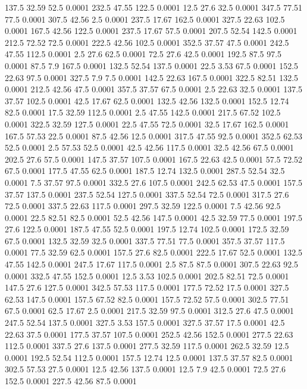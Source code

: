 137.5	32.59	52.5	0.0001
232.5	47.55	122.5	0.0001
12.5	27.6	32.5	0.0001
347.5	77.51	77.5	0.0001
307.5	42.56	2.5	0.0001
237.5	17.67	162.5	0.0001
327.5	22.63	102.5	0.0001
167.5	42.56	122.5	0.0001
237.5	17.67	57.5	0.0001
207.5	52.54	142.5	0.0001
212.5	72.52	72.5	0.0001
222.5	42.56	102.5	0.0001
352.5	37.57	47.5	0.0001
242.5	47.55	112.5	0.0001
2.5	27.6	62.5	0.0001
72.5	27.6	42.5	0.0001
192.5	87.5	97.5	0.0001
87.5	7.9	167.5	0.0001
132.5	52.54	137.5	0.0001
22.5	3.53	67.5	0.0001
152.5	22.63	97.5	0.0001
327.5	7.9	7.5	0.0001
142.5	22.63	167.5	0.0001
322.5	82.51	132.5	0.0001
212.5	42.56	47.5	0.0001
357.5	37.57	67.5	0.0001
2.5	22.63	32.5	0.0001
137.5	37.57	102.5	0.0001
42.5	17.67	62.5	0.0001
132.5	42.56	132.5	0.0001
152.5	12.74	82.5	0.0001
17.5	32.59	112.5	0.0001
2.5	47.55	142.5	0.0001
217.5	67.52	102.5	0.0001
322.5	32.59	127.5	0.0001
22.5	47.55	72.5	0.0001
32.5	17.67	162.5	0.0001
167.5	57.53	22.5	0.0001
87.5	42.56	12.5	0.0001
317.5	47.55	92.5	0.0001
352.5	62.53	52.5	0.0001
2.5	57.53	52.5	0.0001
42.5	42.56	117.5	0.0001
32.5	42.56	67.5	0.0001
202.5	27.6	57.5	0.0001
147.5	37.57	107.5	0.0001
167.5	22.63	42.5	0.0001
57.5	72.52	67.5	0.0001
177.5	47.55	62.5	0.0001
187.5	12.74	132.5	0.0001
287.5	52.54	32.5	0.0001
7.5	37.57	97.5	0.0001
332.5	27.6	107.5	0.0001
242.5	62.53	47.5	0.0001
157.5	37.57	137.5	0.0001
237.5	52.54	127.5	0.0001
337.5	52.54	72.5	0.0001
317.5	27.6	72.5	0.0001
337.5	22.63	117.5	0.0001
297.5	32.59	122.5	0.0001
7.5	42.56	92.5	0.0001
22.5	82.51	82.5	0.0001
52.5	42.56	147.5	0.0001
42.5	32.59	77.5	0.0001
197.5	27.6	122.5	0.0001
187.5	47.55	52.5	0.0001
197.5	12.74	102.5	0.0001
172.5	32.59	67.5	0.0001
132.5	32.59	32.5	0.0001
337.5	77.51	77.5	0.0001
357.5	37.57	117.5	0.0001
77.5	32.59	62.5	0.0001
157.5	27.6	82.5	0.0001
222.5	17.67	52.5	0.0001
132.5	47.55	142.5	0.0001
247.5	17.67	117.5	0.0001
2.5	87.5	87.5	0.0001
307.5	22.63	92.5	0.0001
332.5	47.55	152.5	0.0001
12.5	3.53	102.5	0.0001
202.5	82.51	72.5	0.0001
147.5	27.6	127.5	0.0001
342.5	57.53	117.5	0.0001
177.5	72.52	17.5	0.0001
327.5	62.53	147.5	0.0001
157.5	67.52	82.5	0.0001
157.5	72.52	57.5	0.0001
302.5	77.51	67.5	0.0001
62.5	17.67	2.5	0.0001
217.5	32.59	97.5	0.0001
312.5	27.6	47.5	0.0001
247.5	52.54	137.5	0.0001
327.5	3.53	157.5	0.0001
327.5	37.57	17.5	0.0001
42.5	22.63	37.5	0.0001
177.5	37.57	107.5	0.0001
252.5	42.56	152.5	0.0001
277.5	22.63	112.5	0.0001
337.5	27.6	137.5	0.0001
277.5	32.59	117.5	0.0001
262.5	32.59	12.5	0.0001
192.5	52.54	112.5	0.0001
157.5	12.74	12.5	0.0001
137.5	37.57	82.5	0.0001
302.5	57.53	27.5	0.0001
12.5	42.56	137.5	0.0001
12.5	7.9	42.5	0.0001
72.5	27.6	152.5	0.0001
227.5	42.56	87.5	0.0001
